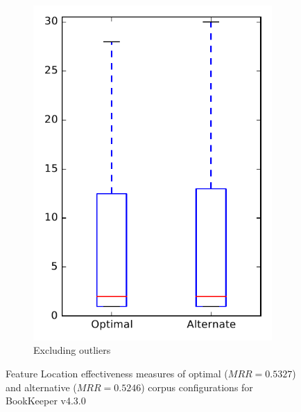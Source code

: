 \begin{figure}
\begin{subfigure}{.4\textwidth}
        \includegraphics[height=0.4\textheight]{figures/combo/flt_rq2_bookkeeper_no_outlier}
        \caption{Excluding outliers}\label{fig:combo:flt:rq2:bookkeeper_no_outlier}
    \end{subfigure}
\caption{Feature Location effectiveness measures of optimal ($MRR=0.5327$) and alternative ($MRR=0.5246$) corpus configurations for BookKeeper v4.3.0}
\label{fig:combo:flt:rq2:bookkeeper}
\end{figure}
